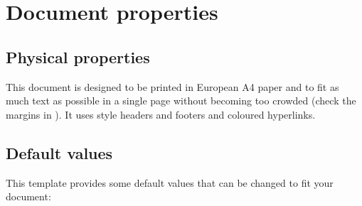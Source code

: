 \section{Document properties}

\subsection{Physical properties}

This document is designed to be printed in European A4 paper and to fit as much text as possible in a single page without becoming too crowded (check the margins in ).
It uses  style headers and footers and coloured hyperlinks.

\subsection{Default values}

This template provides some default values that can be changed to fit your document:

